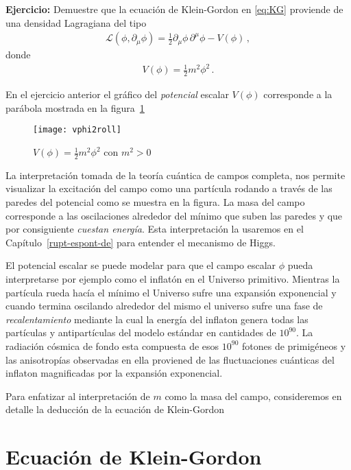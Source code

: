\textbf{Ejercicio:} Demuestre que la ecuación de Klein-Gordon en \eqref{eq:KG} proviende de una densidad Lagragiana del tipo
\begin{align}
  \mathcal{L}(\phi,\partial_{\mu} \phi)=  \frac{1}{2}{\partial_\mu\phi}\,{\partial^\mu\phi}-V(\phi)\,,
\end{align}
donde
\begin{align}
  V(\phi)=\frac{1}{2}m^2 \phi^2\,.
\end{align}

En el ejercicio anterior el gráfico del \emph{potencial} escalar $V(\phi)$ corresponde a la parábola mostrada en la figura~\ref{fig:x2ini}


\begin{figure} %
  \centering %
  \texttt{[image: vphi2roll]}
  \caption{$V(\phi)=\frac{1}{2}m^2 \phi^2$ con $m^2\gt 0$} %
  \label{fig:x2ini} %
\end{figure} %



La interpretación tomada de la teoría cuántica de campos completa, nos permite visualizar la excitación del campo como una partícula rodando a través de las paredes del potencial como se muestra en la figura. La masa del campo corresponde a las oscilaciones alrededor del mínimo que suben las paredes y que por consiguiente \emph{cuestan energía}. Esta interpretación la usaremos en el Capítulo~\ref{rupt-espont-de} para entender el mecanismo de Higgs.

El potencial escalar se puede modelar para que el campo escalar $\phi$ pueda interpretarse por ejemplo como el inflatón en el Universo primitivo. Mientras la partícula rueda hacía el mínimo el Universo sufre una expansión exponencial y cuando termina oscilando alrededor del mismo el universo sufre una fase de \emph{recalentamiento} mediante la cual la energía del inflaton genera todas las partículas y antipartículas del modelo estándar en cantidades de $10^{90}$. La radiación cósmica de fondo esta compuesta de esos $10^{90}$ fotones de primigéneos y las anisotropías observadas en ella proviened de las fluctuaciones cuánticas del inflaton magnificadas por la expansión exponencial.

Para enfatizar al interpretación de $m$ como la masa del campo, consideremos en detalle la deducción de la ecuación de Klein-Gordon


\section{Ecuación de Klein-Gordon}


